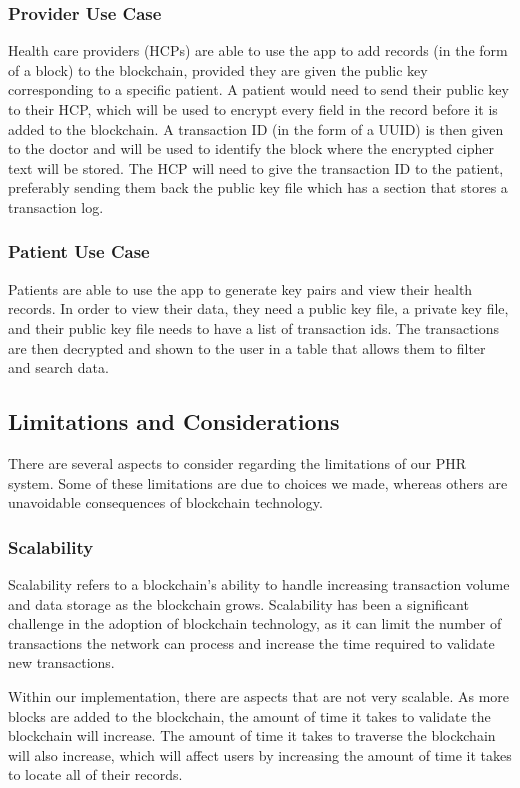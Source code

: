 \documentclass{article}
\begin{document}
\subsubsection{Provider Use Case}
Health care providers (HCPs) are able to use the app to add records (in the form of a block) to the blockchain, provided they are given the public key corresponding to a specific patient. A patient would need to send their public key to their HCP, which will be used to encrypt every field in the record before it is added to the blockchain. A transaction ID (in the form of a UUID) is then given to the doctor and will be used to identify the block where the encrypted cipher text will be stored. The HCP will need to give the transaction ID to the patient, preferably sending them back the public key file which has a section that stores a transaction log.

\subsubsection{Patient Use Case}
Patients are able to use the app to generate key pairs and view their health records. In order to view their data, they need a public key file, a private key file, and their public key file needs to have a list of transaction ids. The transactions are then decrypted and shown to the user in a table that allows them to filter and search data.

\subsection{Limitations and Considerations}

There are several aspects to consider regarding the limitations of our PHR system. Some of these limitations are due to choices we made, whereas others are unavoidable consequences of blockchain technology.

\subsubsection{Scalability}
Scalability refers to a blockchain's ability to handle increasing transaction volume and data storage as the blockchain grows. Scalability has been a significant challenge in the adoption of blockchain technology, as it can limit the number of transactions the network can process and increase the time required to validate new transactions.

Within our implementation, there are aspects that are not very scalable. As more blocks are added to the blockchain, the amount of time it takes to validate the blockchain will increase. The amount of time it takes to traverse the blockchain will also increase, which will affect users by increasing the amount of time it takes to locate all of their records.
\end{document}
